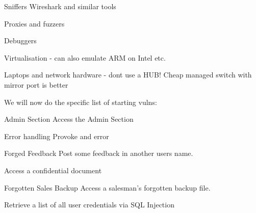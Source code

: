 \documentclass[Screen16to9,17pt]{foils}
\begin{document}
\begin{list2}
\item Sniffers Wireshark and similar tools
\item Proxies and fuzzers
\item Debuggers
\item Virtualisation - can also emulate ARM on Intel etc.
\item Laptops and network hardware - dont use a HUB! Cheap managed switch with mirror port is better
\end{list2}



We will now do the specific list of starting vulns:
\begin{list2}
\item Admin Section Access the Admin Section
\item Error handling Provoke and error
\item Forged Feedback Post some feedback in another users name.
\item Access a confidential document
\item Forgotten Sales Backup Access a salesman's forgotten backup file.
\item Retrieve a list of all user credentials via SQL Injection
\end{list2}

\slidenext{}
\end{document}
